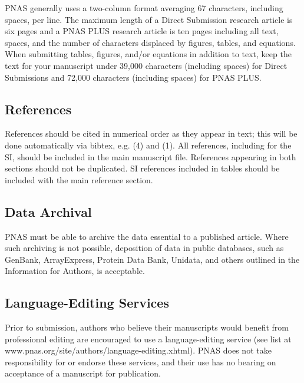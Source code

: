 \documentclass[9pt,twocolumn,twoside,]{pnas-new}
\begin{document}
PNAS generally uses a two-column format averaging 67 characters,
including spaces, per line. The maximum length of a Direct Submission
research article is six pages and a PNAS PLUS research article is ten
pages including all text, spaces, and the number of characters displaced
by figures, tables, and equations. When submitting tables, figures,
and/or equations in addition to text, keep the text for your manuscript
under 39,000 characters (including spaces) for Direct Submissions and
72,000 characters (including spaces) for PNAS PLUS.

\hypertarget{references}{%
\subsection*{References}\label{references}}

References should be cited in numerical order as they appear in text;
this will be done automatically via bibtex, e.g. (4) and (1). All
references, including for the SI, should be included in the main
manuscript file. References appearing in both sections should not be
duplicated. SI references included in tables should be included with the
main reference section.

\hypertarget{data-archival}{%
\subsection*{Data Archival}\label{data-archival}}

PNAS must be able to archive the data essential to a published article.
Where such archiving is not possible, deposition of data in public
databases, such as GenBank, ArrayExpress, Protein Data Bank, Unidata,
and others outlined in the Information for Authors, is acceptable.

\hypertarget{language-editing-services}{%
\subsection*{Language-Editing
Services}\label{language-editing-services}}

Prior to submission, authors who believe their manuscripts would benefit
from professional editing are encouraged to use a language-editing
service (see list at www.pnas.org/site/authors/language-editing.xhtml).
PNAS does not take responsibility for or endorse these services, and
their use has no bearing on acceptance of a manuscript for publication.
\end{document}
